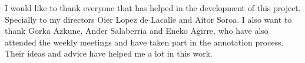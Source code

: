 I would like to thank everyone that has helped in the development of this project. Specially to my directors Oier Lopez de Lacalle and Aitor Soroa. I also want to thank Gorka Azkune, Ander Salaberria and Eneko Agirre, who have also attended the weekly meetings and have taken part in the annotation process. Their ideas and advice have helped me a lot in this work.